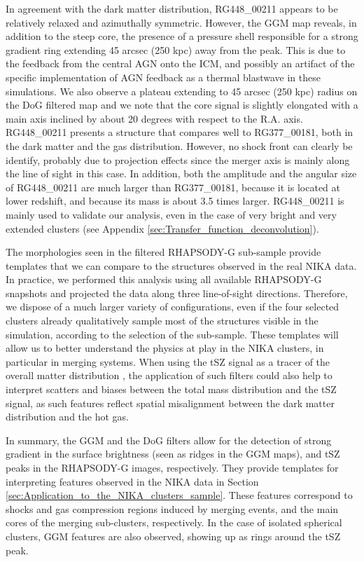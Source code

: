 \documentclass[traditabstract]{aa}
\begin{document}
In agreement with the dark matter distribution, RG448\_00211 appears to be relatively relaxed and azimuthally symmetric. However, the GGM map reveals, in addition to the steep core, the presence of a pressure shell responsible for a strong gradient ring extending 45 arcsec (250 kpc) away from the peak. This is due to the feedback from the central AGN onto the ICM, and possibly an artifact of the specific implementation of AGN feedback as a thermal blastwave in these simulations. We also observe a plateau extending to 45 arcsec (250 kpc) radius on the DoG filtered map and we note that the core signal is slightly elongated with a main axis inclined by about 20 degrees with respect to the R.A. axis. RG448\_00211 presents a structure that compares well to RG377\_00181, both in the dark matter and the gas distribution. However, no shock front can clearly be identify, probably due to projection effects since the merger axis is mainly along the line of sight in this case. In addition, both the amplitude and the angular size of RG448\_00211 are much larger than RG377\_00181, because it is located at lower redshift, and because its mass is about 3.5 times larger. RG448\_00211 is mainly used to validate our analysis, even in the case of very bright and very extended clusters (see Appendix \ref{sec:Transfer_function_deconvolution}).

The morphologies seen in the filtered RHAPSODY-G sub-sample provide templates that we can compare to the structures observed in the real NIKA data. In practice, we performed this analysis using all available RHAPSODY-G snapshots and projected the data along three line-of-sight directions. Therefore, we dispose of a much larger variety of configurations, even if the four selected clusters already qualitatively sample most of the structures visible in the simulation, according to the selection of the sub-sample. These templates will allow us to better understand the physics at play in the NIKA clusters, in particular in merging systems. When using the tSZ signal as a tracer of the overall matter distribution \citep[e.g.,][]{Adam2015,Adam2016a,Ruppin2016}, the application of such filters could also help to interpret scatters and biases between the total mass distribution and the tSZ signal, as such features reflect spatial misalignment between the dark matter distribution and the hot gas.

In summary, the GGM and the DoG filters allow for the detection of strong gradient in the surface brightness (seen as ridges in the GGM maps), and tSZ peaks in the RHAPSODY-G images, respectively. They provide templates for interpreting features observed in the NIKA data in Section \ref{sec:Application_to_the_NIKA_clusters_sample}. These features correspond to shocks and gas compression regions induced by merging events, and the main cores of the merging sub-clusters, respectively. In the case of isolated spherical clusters, GGM features are also observed, showing up as rings around the tSZ peak.
\end{document}
